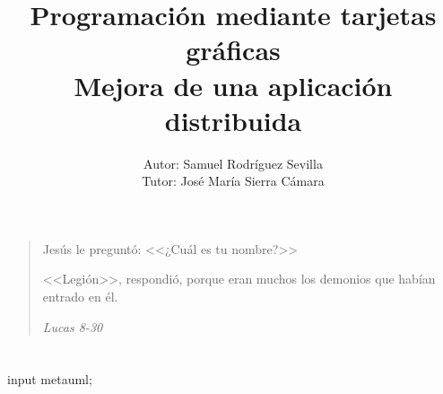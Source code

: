 \documentclass[12pt]{book}
\begin{document}
	
	\title{Programación mediante tarjetas gráficas\\Mejora de una aplicación distribuida}
	\author{Autor: Samuel Rodríguez Sevilla\\Tutor: José María Sierra Cámara}
	
	\maketitle
	
	\section*{}
	\pagebreak\newpage

	\vspace*{\fill}
	\begin{quote}
		Jesús le preguntó: <<¿Cuál es tu nombre?>>
		
		<<Legión>>, respondió, porque eran muchos los demonios que habían entrado en él.
		
		\emph{Lucas 8-30}
	\end{quote}
	\vspace*{\fill}
	
	\pagebreak\newpage
	\section*{}
	\pagebreak\newpage
	
	
	
	\tableofcontents
	\listoffigures
	\listoftables
	
	\begin{empfile}
	\begin{empcmds}
	input metauml;
	\end{empcmds}
	
	
	
	
	
	
	
	
	\appendix
	
	
	
	
	
	
	
	
	
	\end{empfile}
	
	
\end{document}
